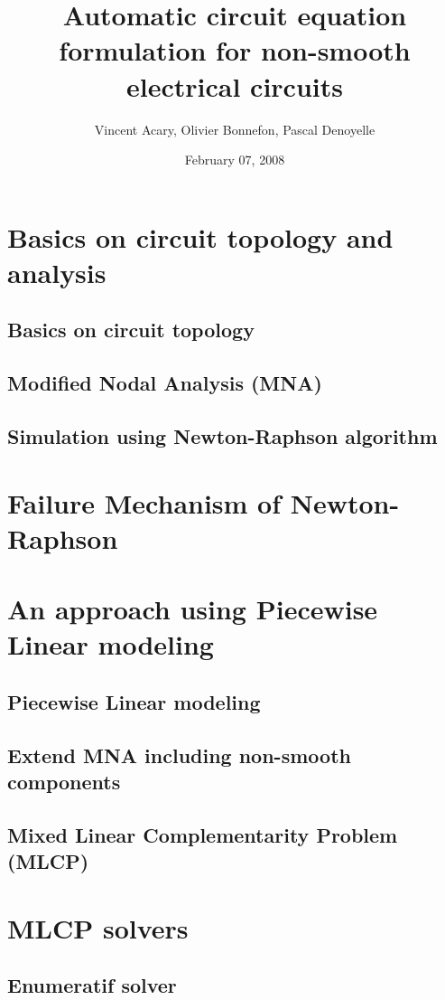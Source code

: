 \documentclass[8pt,xcolor*pst]{beamer}
\title{Automatic circuit equation formulation for non-smooth electrical circuits}
\author{Vincent Acary, Olivier Bonnefon, Pascal Denoyelle}
\date{February 07, 2008}
\institute{INRIA Rh\^one-Alpes}
\begin{document}
\frame{\titlepage}
\frame{\tableofcontents}%
\section{Basics on circuit topology and analysis}
\subsection{Basics on circuit topology}

\subsection{Modified Nodal Analysis (MNA)}

\subsection{Simulation using Newton-Raphson algorithm}

\section{Failure Mechanism of Newton-Raphson}

\section{An approach using Piecewise Linear modeling}
\subsection{Piecewise Linear modeling}

\subsection{Extend MNA including non-smooth components}

\subsection{Mixed Linear Complementarity Problem (MLCP)}

\section{MLCP solvers}
\subsection{Enumeratif solver}

\end{document}
